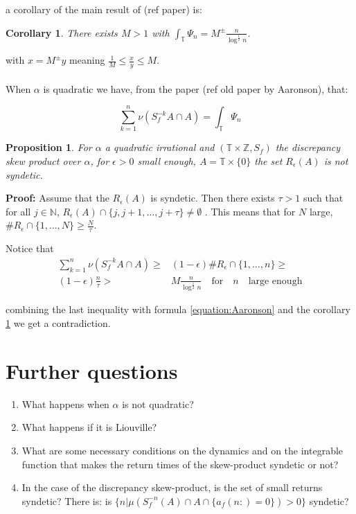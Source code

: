 \documentclass{article}
\newtheorem{corollary}{Corollary}[theorem]
\newtheorem{proposition}{Proposition}[section]
\begin{document}
a corollary of the  main result of (ref paper) is:

\begin{corollary}\label{corollary:Aaronson}
There exists $M>1$ with $\int_\mathbb{T} \Psi_n=M^{\pm}\frac{n}{\log^{\frac{1}{2}}n}$. 
\end{corollary}

with $x=M^\pm y$ meaning $\frac{1}{M}\leq \frac{x}{y}\leq M$.
\paragraph{}
When $\alpha$ is quadratic we have, from the paper (ref old paper
by Aaronson), that:

\begin{equation}\label{equation:Aaronson}
    \sum_{k=1}^{n}\nu (S_f^{-k}A\cap A)=\int_\mathbb{T}\Psi_n
\end{equation}


\begin{proposition}
For $\alpha$ a quadratic irrational and $(\mathbb{T}\times\mathbb{Z},
S_f)$ the discrepancy skew product over $\alpha$, for $\epsilon>0$ small
enough, $A=\mathbb{T}\times \{0\}$ the set $R_{\epsilon}(A)$ is not
syndetic.
\end{proposition}

\textbf{Proof:} Assume that the $R_\epsilon(A)$ is
syndetic. Then there exists $\tau>1$ such that for all $j\in\mathbb{N}$, $R_\epsilon(A)\cap
\{j,j+1,\ldots,j+\tau\}\neq \emptyset$ . This means that for $N$
large, $\# R_\epsilon\cap \{1,\ldots,N\}\geq \frac{N}{\tau}$.

Notice that 
\begin{align}
    \sum_{k=1}^{n}\nu (S_f^{-k}A\cap A)\geq& (1-\epsilon)\#R_\epsilon\cap \{1,\ldots,n\}\geq\\
    (1-\epsilon)\frac{n}{\tau}>& M \frac{n}{\log^{\frac{1}{2}}n}\quad \text{for}\quad n\quad \text{large enough}      
\end{align}

combining the last inequality with formula
 \ref{equation:Aaronson} and the corollary \ref{corollary:Aaronson}
 we get a contradiction.
 
 

 \section{Further questions}

 \begin{enumerate}
    \item What happens when $\alpha$ is not quadratic?
    \item What happens if it is Liouville?
    \item What are some necessary conditions on the dynamics and on the integrable function that makes the return times of the skew-product syndetic or not?
    \item In the case of the discrepancy skew-product, is the set of small returns syndetic? There is: is $\{n|\mu(S_f^{-n}(A)\cap A\cap \{a_f(n:)=0\})>0\}$ syndetic?
 \end{enumerate}
\end{document}
